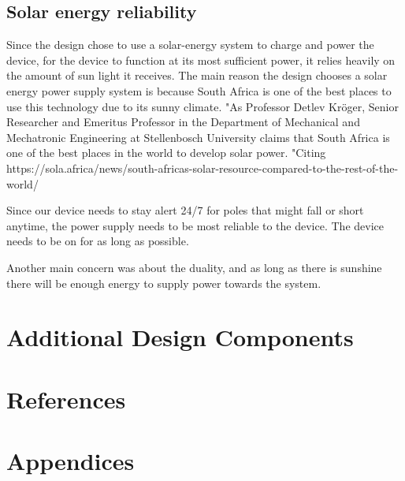 \documentclass[12pt]{article}
\begin{document}
\subsection{Solar energy reliability}
Since the design chose to use a solar-energy system to charge and power the device, for the device to function at its most sufficient power, it relies heavily on the amount of sun light it receives. The main reason the design chooses a solar energy power supply system is because South Africa is one of the best places to use this technology due to its sunny climate. "As Professor Detlev Kröger, Senior Researcher and Emeritus Professor in the Department of Mechanical and Mechatronic Engineering at Stellenbosch University claims that South Africa is one of the best places in the world to develop solar power. "Citing
https://sola.africa/news/south-africas-solar-resource-compared-to-the-rest-of-the-world/




Since our device needs to stay alert 24/7 for poles that might fall or short anytime, the power supply needs to be most reliable to the device. The device needs to be on for as long as possible. 

Another main concern was about the duality, and as long as there is sunshine there will be enough energy to supply power towards the system.  

\section{Additional Design Components}

\section{References}
\printbibliography

\section{Appendices}
\end{document}

